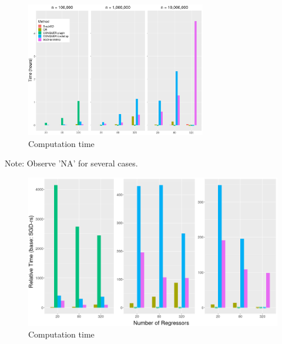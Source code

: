 \documentclass[beamer, t]{beamer}
\begin{document}
\begin{frame}
	\begin{figure}[!htbp]
		\caption{Computation time} \label{fig:time}
		\centering
		\vskip10pt
		\includegraphics[width=0.7\textwidth]{fig_time.png}
	\end{figure}

Note: Observe 'NA' for several cases.
	
\end{frame}
\begin{frame}
	\begin{figure}[!htbp]
		\caption{Computation time} \label{fig:time}
		\centering
		\vskip10pt
		\includegraphics[width=\textwidth]{fig_rel_time.png}
	\end{figure}
	
\end{frame}
\end{document}
